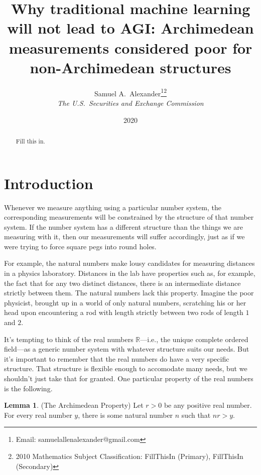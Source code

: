 \documentclass[reqno]{article}
\theoremstyle{definition}
\newtheorem{lemma}[theorem]{Lemma}
\begin{document}
\title{Why traditional machine learning will not lead to AGI:
Archimedean measurements considered poor for non-Archimedean structures}

\author{Samuel A.~Alexander\thanks{Email:
samuelallenalexander@gmail.com}\hphantom{*}\footnote{2010 Mathematics 
Subject Classification: FillThisIn
(Primary), FillThisIn (Secondary)}\\
\emph{The U.S.\ Securities and Exchange Commission}}
\date{2020}
\maketitle

\begin{abstract}
    Fill this in.
\end{abstract}

\section{Introduction}

Whenever we measure anything using a particular number system, the
corresponding measurements will be constrained by the structure of that
number system. If the number system has a different structure than
the things we are measuring with it, then our
measurements will suffer accordingly, just as if we were trying to
force square pegs into round holes.

For example, the natural numbers make lousy candidates for measuring
distances in a physics laboratory. Distances in the lab have
properties such as, for example, the fact that for any two distinct
distances, there is an intermediate distance strictly between them.
The natural numbers lack this property. Imagine the poor physicist,
brought up in a world of only natural numbers, scratching his or her
head upon encountering a rod with length strictly between two rods
of length $1$ and $2$.

It's tempting to think of the real numbers $\mathbb R$---i.e., the unique
complete ordered field---as a generic number system with whatever
structure suits our needs. But it's important to remember that the
real numbers do have a very specific structure. That structure is
flexible enough to accomodate many needs, but we shouldn't just
take that for granted. One particular property of the real numbers
is the following.

\begin{lemma}
\label{specializedarchimedeanlemma}
(The Archimedean Property)
Let $r>0$ be any positive real number.
For every real number $y$, there is some natural number $n$
such that $nr>y$.
\end{lemma}
\end{document}
